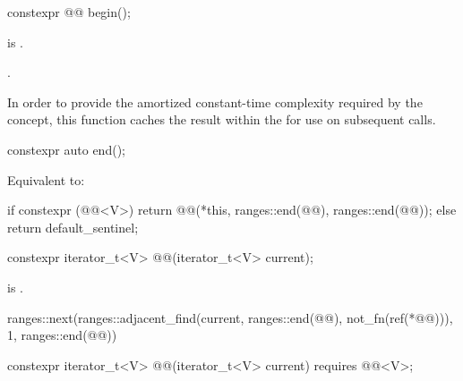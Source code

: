 \begin{itemdecl}
constexpr @@ begin();
\end{itemdecl}

\begin{itemdescr}
\pnum
\expects
{} is .

\pnum
\returns
{}.

\pnum
\remarks
In order to provide
the amortized constant-time complexity required by the  concept,
this function caches the result within the 
for use on subsequent calls.
\end{itemdescr}

\begin{itemdecl}
constexpr auto end();
\end{itemdecl}

\begin{itemdescr}
\pnum
\effects
Equivalent to:
\begin{codeblock}
if constexpr (@@<V>) {
  return @@(*this, ranges::end(@@), ranges::end(@@));
} else {
  return default_sentinel;
}
\end{codeblock}
\end{itemdescr}

\begin{itemdecl}
constexpr iterator_t<V> @@(iterator_t<V> current);
\end{itemdecl}

\begin{itemdescr}
\pnum
\expects
{} is .

\pnum
\returns
\begin{codeblock}
ranges::next(ranges::adjacent_find(current, ranges::end(@@), not_fn(ref(*@@))),
             1, ranges::end(@@))
\end{codeblock}
\end{itemdescr}

\begin{itemdecl}
constexpr iterator_t<V> @@(iterator_t<V> current) requires @@<V>;
\end{itemdecl}

